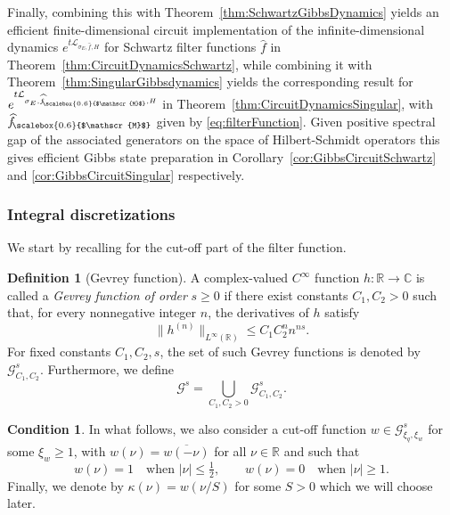 \documentclass[11pt]{amsart}
\newcommand{\1}{\mathbbm{1}}
\newcommand{\cL}{\mathcal{L}}
\newcommand{\hatfM}{\widehat{f}_{\!\scalebox{0.6}{$\mathscr{M}$}}
}
\theoremstyle{plain}
\theoremstyle{definition}
\newtheorem{definition}[theorem]{Definition}
\newtheorem{condition}[theorem]{Condition}
\theoremstyle{remark}
\numberwithin{equation}{section}
\begin{document}
Finally, combining this with Theorem~\ref{thm:SchwartzGibbsDynamics} yields an efficient finite-dimensional circuit implementation of the infinite-dimensional dynamics \(e^{t\cL_{\sigma_E,\widehat f,H}}\) for Schwartz filter functions \(\widehat f\) in Theorem~\ref{thm:CircuitDynamicsSchwartz}, while combining it with Theorem~\ref{thm:SingularGibbsdynamics} yields the corresponding result for \(e^{t\cL_{\sigma_E,\hatfM,H}}\) in Theorem~\ref{thm:CircuitDynamicsSingular}, with \(\hatfM\) given by \eqref{eq:filterFunction}. Given positive spectral gap of the associated generators on the space of Hilbert-Schmidt operators this gives efficient Gibbs state preparation in Corollary~\ref{cor:GibbsCircuitSchwartz} and \ref{cor:GibbsCircuitSingular} respectively.


\subsubsection{Integral discretizations}
\label{sec:IntegralDiscretization}

We start by recalling \cite[Assumption 13]{ding2025efficient} for the cut-off part of the filter function.
\begin{definition}[Gevrey function]
 A complex-valued $C^\infty$ function
$h : \mathbb{R} \to \mathbb{C}$ is called a \emph{Gevrey function of order} $s \ge 0$ if there exist
constants $C_1, C_2 > 0$ such that, for every nonnegative integer
$n $, the derivatives of $h$ satisfy
\begin{equation}
\label{eq:gevrey-def}
\| h^{(n)}\|_{L^\infty(\mathbb{R})}
\le
C_1 C_2^{n} n^{n s}.
\end{equation}
For fixed constants $C_1, C_2, s$, the set of such Gevrey functions is denoted by $\mathcal{G}^s_{C_1,C_2}$. Furthermore, we define
\[
\mathcal{G}^s = \bigcup_{C_1,C_2>0} \mathcal{G}^s_{C_1,C_2}.
\]


\end{definition}


\begin{condition}
\label{cond:Window}
 In what follows, we also consider a cut-off function $w\in \mathcal{G}^s_{\xi_q,\xi_w}$ for some $\xi_w\ge 1$, with $w(\nu) = \overline{w(-\nu)}$ for all $\nu\in\mathbb{R}$ and such that 
    \[
    w(\nu) = 1 \quad \text{when } |\nu| \le \tfrac12,
    \qquad
    w(\nu) = 0 \quad \text{when } |\nu| \ge 1.
    \]
    Finally, we denote by $\kappa(\nu)=w(\nu/S)$ for some $S>0$ which we will choose later.
\end{condition}
\end{document}
